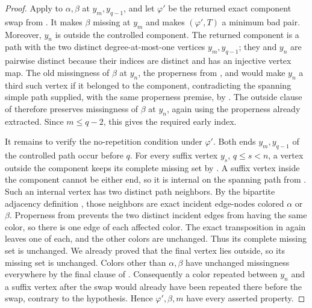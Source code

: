 \begin{proof}
Apply  to \(\alpha,\beta\) at
\(y_m,y_{q-1}\), and let \(\varphi'\) be the returned exact component
swap from .  It makes \(\beta\) missing
at \(y_m\) and makes \((\varphi',T)\) a minimum bad pair.  Moreover,
\(y_n\) is outside the controlled component.  The returned component
is a path with the two distinct degree-at-most-one vertices
\(y_m,y_{q-1}\); they and \(y_n\) are pairwise distinct because their
indices are distinct and  has an injective vertex
map.  The old missingness of \(\beta\) at \(y_n\), the properness from
, and  would
make \(y_n\) a third such vertex if it belonged to the component,
contradicting the spanning simple path supplied, with the same
properness premise, by .  The
outside clause of 
therefore preserves missingness of \(\beta\) at \(y_n\), again using
the properness already extracted.  Since
\(m\le q-2\), this gives the required early index.

It remains to verify the no-repetition condition under \(\varphi'\).
Both ends \(y_m,y_{q-1}\) of the controlled path occur before \(q\).
For every suffix vertex \(y_s\), \(q\le s<n\), a vertex outside the
component keeps its complete missing set by
.  A suffix vertex inside
the component cannot be either end, so it is internal on the spanning
path from .  Such an internal
vertex has two distinct path neighbors.  By the bipartite adjacency
definition , those neighbors are exact
incident edge-nodes colored \(\alpha\) or \(\beta\).  Properness from
 prevents the two distinct incident edges from having
the same color, so there is one edge of each affected color.  The exact
transposition in  again leaves one of
each, and the other colors are unchanged.  Thus its complete missing set
is unchanged.  We already proved that the final vertex lies outside,
so its missing set is unchanged.  Colors other than
\(\alpha,\beta\) have unchanged missingness everywhere by the final
clause of .  Consequently
a color repeated between \(y_n\) and a suffix vertex after the swap
would already have been repeated there before the swap, contrary to the
hypothesis.  Hence \(\varphi',\beta,m\) have every asserted property.
\end{proof}
